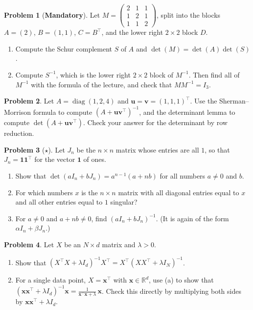 \documentclass[11pt]{article}
\theoremstyle{definition}
\newtheorem{problem}{Problem}[section]
\newcommand{\mandatory}{\textcolor{red!70!black}{\textbf{Mandatory}}}
\DeclareMathOperator{\diag}{diag}
\begin{document}
\begin{problem}[\mandatory]\label{pr:schur-practice}
    Let $M = \begin{pmatrix} 2 & 1 & 1 \\ 1 & 2 & 1 \\ 1 & 1 & 2 \end{pmatrix}$, split into the blocks $A = (2)$, $B = (1, 1)$, $C = B^\top$, and the lower right $2 \times 2$ block $D$.
    \begin{enumerate}[label=(\alph*)]
        \item Compute the Schur complement $S$ of $A$ and $\det(M) = \det(A)\det(S)$.
        \item Compute $S^{-1}$, which is the lower right $2 \times 2$ block of $M^{-1}$. Then find all of $M^{-1}$ with the formula of the lecture, and check that $MM^{-1} = I_3$.
    \end{enumerate}
\end{problem}

\begin{problem}\label{pr:sherman-morrison-practice}
    Let $A = \diag(1, 2, 4)$ and $\mathbf{u} = \mathbf{v} = (1, 1, 1)^\top$. Use the Sherman--Morrison formula to compute $(A + \mathbf{u}\mathbf{v}^\top)^{-1}$, and the determinant lemma to compute $\det(A + \mathbf{u}\mathbf{v}^\top)$. Check your answer for the determinant by row reduction.
\end{problem}

\begin{problem}[$\star$]\label{pr:det-lemma-practice}
    Let $J_n$ be the $n \times n$ matrix whose entries are all $1$, so that $J_n = \mathbf{1}\mathbf{1}^\top$ for the vector $\mathbf{1}$ of ones.
    \begin{enumerate}[label=(\alph*)]
        \item Show that $\det(aI_n + bJ_n) = a^{n-1}(a + nb)$ for all numbers $a \neq 0$ and $b$.
        \item For which numbers $x$ is the $n \times n$ matrix with all diagonal entries equal to $x$ and all other entries equal to $1$ singular?
        \item For $a \neq 0$ and $a + nb \neq 0$, find $(aI_n + bJ_n)^{-1}$. (It is again of the form $\alpha I_n + \beta J_n$.)
    \end{enumerate}
\end{problem}

\begin{problem}\label{pr:push-through}
    Let $X$ be an $N \times d$ matrix and $\lambda > 0$.
    \begin{enumerate}[label=(\alph*)]
        \item Show that $(X^\top X + \lambda I_d)^{-1}X^\top = X^\top(XX^\top + \lambda I_N)^{-1}$.
        \item For a single data point, $X = \mathbf{x}^\top$ with $\mathbf{x} \in \mathbb{R}^d$, use (a) to show that $(\mathbf{x}\mathbf{x}^\top + \lambda I_d)^{-1}\mathbf{x} = \frac{1}{\mathbf{x}^\top \mathbf{x} + \lambda}\,\mathbf{x}$. Check this directly by multiplying both sides by $\mathbf{x}\mathbf{x}^\top + \lambda I_d$.
    \end{enumerate}
\end{problem}
\end{document}
